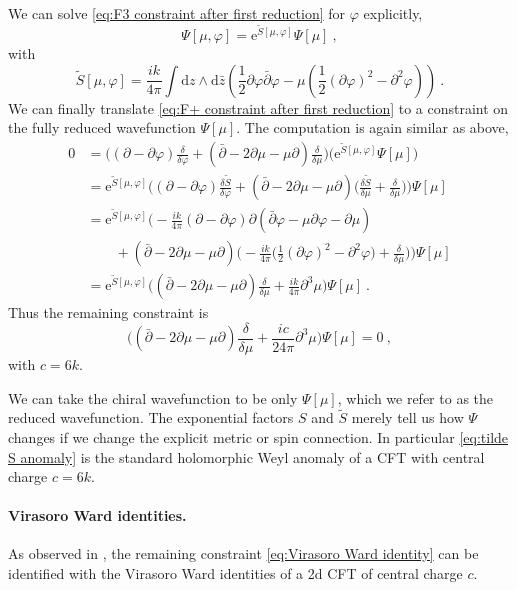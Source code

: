 \documentclass[12pt,a4paper]{article}
\newcommand{\be}{\begin{equation}}
\newcommand{\ee}{\end{equation}}
\renewcommand\d{\text{d}}
\begin{document}
We can solve \eqref{eq:F3 constraint after first reduction} for $\varphi$ explicitly,
\be 
\Psi[\mu,\varphi]=\mathrm{e}^{\tilde{S}[\mu,\varphi]} \Psi[\mu]~,
\ee
with 
\be 
\tilde{S}[\mu,\varphi]=\frac{i k}{4\pi} \int \d z \wedge \d \bar{z} \left(\frac{1}{2} \partial \varphi\bar{\partial} \varphi-\mu \left(\frac{1}{2}(\partial \varphi)^2-\partial^2 \varphi \right) \right)~. \label{eq:tilde S anomaly}
\ee
We can finally translate \eqref{eq:F+ constraint after first reduction} to a constraint on the fully reduced wavefunction $\Psi[\mu]$. The computation is again similar as above,
\begin{align} \nonumber
    0&=\bigg( (\partial -\partial \varphi) \frac{\delta}{\delta \varphi}+(\bar{\partial}-2 \partial \mu-\mu \partial) \frac{\delta}{\delta \mu} \bigg)\big(\mathrm{e}^{\tilde{S}[\mu,\varphi]} \Psi[\mu]\big) \\
    &=\mathrm{e}^{\tilde{S}[\mu, \varphi]}\bigg( (\partial -\partial \varphi) \frac{\delta \tilde{S}}{\delta \varphi}+(\bar{\partial}-2 \partial \mu-\mu \partial) \bigg(\frac{\delta \tilde{S}}{\delta \mu}+\frac{\delta}{\delta \mu}\bigg) \bigg) \Psi[\mu]  \nonumber \\
    &=\mathrm{e}^{\tilde{S}[\mu, \varphi]}\bigg(- \frac{ik}{4\pi}(\partial -\partial \varphi) \partial(\bar{\partial} \varphi-\mu \partial \varphi-\partial \mu)\nonumber\\
    &\qquad+(\bar{\partial}-2 \partial \mu-\mu \partial) \bigg(-\frac{i k}{4\pi} \bigg(\frac{1}{2}(\partial \varphi)^2-\partial^2 \varphi\bigg)+\frac{\delta}{\delta \mu}\bigg) \bigg) \Psi[\mu]  \nonumber \\  
    &=\mathrm{e}^{\tilde{S}[\mu, \varphi]}\bigg((\bar{\partial}-2 \partial \mu-\mu \partial) \frac{\delta}{\delta \mu}+\frac{i k}{4\pi} \partial^3 \mu\bigg) \Psi[\mu]~.
\end{align}
Thus the remaining constraint is
\be 
\bigg((\bar{\partial}-2 \partial \mu-\mu \partial) \frac{\delta}{\delta \mu}+\frac{i c}{24\pi} \partial^3 \mu\bigg) \Psi[\mu]=0~, \label{eq:Virasoro Ward identity}
\ee
with $c=6k$.

We can take the chiral wavefunction to be only $\Psi[\mu]$, which we refer to as the reduced wavefunction. The exponential factors $S$ and $\tilde{S}$ merely tell us how $\Psi$ changes if we change the explicit metric or spin connection. In particular \eqref{eq:tilde S anomaly} is the standard holomorphic Weyl anomaly of a CFT with central charge $c=6k$. 

\paragraph{Virasoro Ward identities.} As observed in \cite{Verlinde:1989ua}, the remaining constraint \eqref{eq:Virasoro Ward identity} can be identified with the Virasoro Ward identities of a 2d CFT of central charge $c$.
\end{document}
